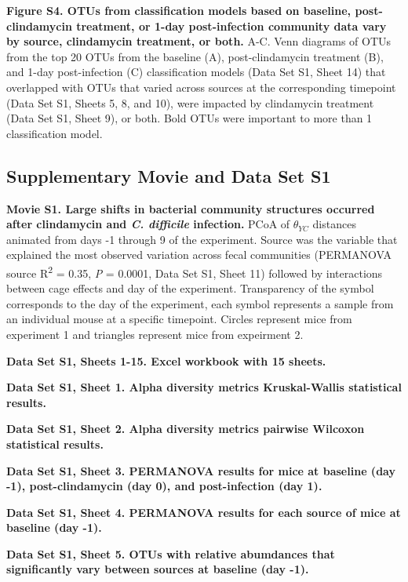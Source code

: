 \documentclass[
  11pt,
]{article}
\begin{document}
\newpage

\textbf{Figure S4. OTUs from classification models based on baseline,
post-clindamycin treatment, or 1-day post-infection community data vary
by source, clindamycin treatment, or both.} A-C. Venn diagrams of OTUs
from the top 20 OTUs from the baseline (A), post-clindamycin treatment
(B), and 1-day post-infection (C) classification models (Data Set S1,
Sheet 14) that overlapped with OTUs that varied across sources at the
corresponding timepoint (Data Set S1, Sheets 5, 8, and 10), were
impacted by clindamycin treatment (Data Set S1, Sheet 9), or both. Bold
OTUs were important to more than 1 classification model.

\newpage

\hypertarget{supplementary-movie-and-data-set-s1}{%
\subsection{Supplementary Movie and Data Set
S1}\label{supplementary-movie-and-data-set-s1}}

\textbf{Movie S1. Large shifts in bacterial community structures
occurred after clindamycin and \emph{C. difficile} infection.} PCoA of
\(\theta_{YC}\) distances animated from days -1 through 9 of the
experiment. Source was the variable that explained the most observed
variation across fecal communities (PERMANOVA source
R\textsuperscript{2} = 0.35, \emph{P} = 0.0001, Data Set S1, Sheet 11)
followed by interactions between cage effects and day of the experiment.
Transparency of the symbol corresponds to the day of the experiment,
each symbol represents a sample from an individual mouse at a specific
timepoint. Circles represent mice from experiment 1 and triangles
represent mice from expeirment 2.

\textbf{Data Set S1, Sheets 1-15. Excel workbook with 15 sheets.}

\textbf{Data Set S1, Sheet 1. Alpha diversity metrics Kruskal-Wallis
statistical results.}

\textbf{Data Set S1, Sheet 2. Alpha diversity metrics pairwise Wilcoxon
statistical results.}

\textbf{Data Set S1, Sheet 3. PERMANOVA results for mice at baseline
(day -1), post-clindamycin (day 0), and post-infection (day 1).}

\textbf{Data Set S1, Sheet 4. PERMANOVA results for each source of mice
at baseline (day -1).}

\textbf{Data Set S1, Sheet 5. OTUs with relative abumdances that
significantly vary between sources at baseline (day -1).}
\end{document}
